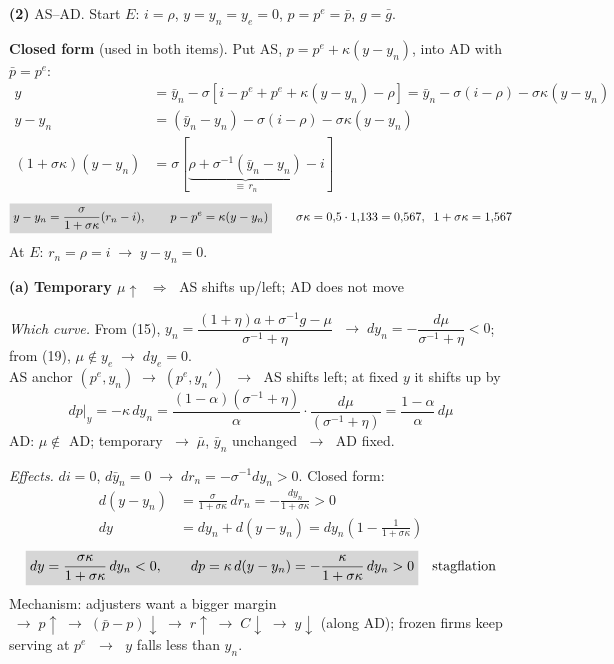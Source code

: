 \documentclass[11pt, a4paper]{article}
\newcommand{\res}[1]{\colorbox{hl}{$\displaystyle #1$}}
\newcommand{\rest}[1]{\colorbox{hl}{#1}}
\newcommand{\q}[1]{\par\medskip\needspace{4\baselineskip}\noindent\textbf{\large(#1)}\quad}
\newcommand{\itm}[1]{\par\smallskip\needspace{3\baselineskip}\noindent\textbf{(#1)}\quad}
\newcommand{\ra}{\;\rightarrow\;}
\newcommand{\Sg}{\left(\sigma^{-1}+\eta\right)}
\begin{document}
\q{2} AS--AD. Start $E$: $i=\rho$, $y=y_n=y_e=0$, $p=p^e=\bar p$, $g=\bar g$.

\textbf{Closed form} (used in both items). Put AS, $p=p^e+\kappa(y-y_n)$, into AD with $\bar p=p^e$:
\begin{align*}
y&=\bar y_n-\sigma\left[i-p^e+p^e+\kappa(y-y_n)-\rho\right]
  =\bar y_n-\sigma(i-\rho)-\sigma\kappa(y-y_n)\\
y-y_n&=(\bar y_n-y_n)-\sigma(i-\rho)-\sigma\kappa(y-y_n)\\
(1+\sigma\kappa)(y-y_n)&=\sigma\left[\underbrace{\rho+\sigma^{-1}(\bar y_n-y_n)}_{\equiv\, r_n}-i\right]
\end{align*}
\[
\res{y-y_n=\frac{\sigma}{1+\sigma\kappa}(r_n-i),\qquad p-p^e=\kappa(y-y_n)}
\qquad \sigma\kappa=0{,}5\cdot1{,}133=0{,}567,\;\;1+\sigma\kappa=1{,}567
\]
At $E$: $r_n=\rho=i\ra y-y_n=0$. \checkmark

\itm{a} \textbf{Temporary $\mu\uparrow$} $\;\Rightarrow\;$ \rest{AS shifts up/left; AD does not move}

\emph{Which curve.} From (15), $y_n=\dfrac{(1+\eta)a+\sigma^{-1}g-\mu}{\sigma^{-1}+\eta}$
$\ra dy_n=-\dfrac{d\mu}{\sigma^{-1}+\eta}<0$; from (19), $\mu\notin y_e\ra dy_e=0$.\\
AS anchor $(p^e,y_n)\ra(p^e,y_n')$ $\ra$ AS shifts left; at fixed $y$ it shifts up by
\[
dp|_y=-\kappa\,dy_n=\frac{(1-\alpha)\Sg}{\alpha}\cdot\frac{d\mu}{\Sg}=\frac{1-\alpha}{\alpha}\,d\mu
\]
AD: $\mu\notin$ AD; temporary $\ra\bar\mu$, $\bar y_n$ unchanged $\ra$ AD fixed.

\emph{Effects.} $di=0$, $d\bar y_n=0\ra dr_n=-\sigma^{-1}dy_n>0$. Closed form:
\begin{align*}
d(y-y_n)&=\frac{\sigma}{1+\sigma\kappa}\,dr_n=-\frac{dy_n}{1+\sigma\kappa}>0\\
dy&=dy_n+d(y-y_n)=dy_n\left(1-\frac{1}{1+\sigma\kappa}\right)
\end{align*}
\[
\res{dy=\frac{\sigma\kappa}{1+\sigma\kappa}\,dy_n<0,\qquad
dp=\kappa\,d(y-y_n)=-\frac{\kappa}{1+\sigma\kappa}\,dy_n>0}\quad\text{stagflation}
\]
Mechanism: adjusters want a bigger margin $\ra p\uparrow\ra(\bar p-p)\downarrow\ra r\uparrow\ra
C\downarrow\ra y\downarrow$ (along AD); frozen firms keep serving at $p^e$ $\ra$ $y$ falls less than $y_n$.
\end{document}
